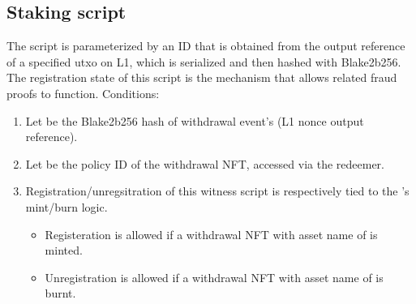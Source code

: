 \documentclass[../midgard.tex]{subfiles}
\begin{document}
\subsection{Staking script}
\label{h:withdrawal-order-staking-script}
The  script is parameterized by an ID that is obtained from the output reference of a specified utxo on L1, which is serialized and then hashed with Blake2b256.
The registration state of this script is the mechanism that allows related fraud proofs to function.
Conditions:

\begin{enumerate}
  \item Let  be the Blake2b256 hash of withdrawal event's  (L1 nonce output reference).
  \item Let  be the policy ID of the withdrawal NFT, accessed via the redeemer.
  \item Registration/unregsitration of this witness script is respectively tied to the 's mint/burn logic. 
    \begin{itemize}
      \item Registeration is allowed if a withdrawal NFT with asset name of  is minted.
      \item Unregistration is allowed if a withdrawal NFT with asset name of  is burnt.
    \end{itemize}
\end{enumerate}
\end{document}
